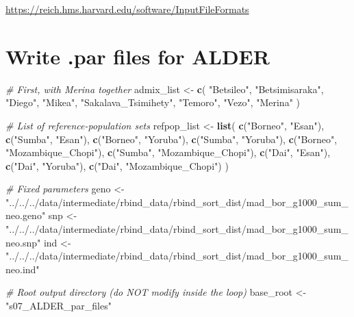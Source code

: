 \documentclass[
]{article}
\newenvironment{Shaded}{\begin{snugshade}}{\end{snugshade}}
\newcommand{\CommentTok}[1]{\textcolor[rgb]{0.56,0.35,0.01}{\textit{#1}}}
\newcommand{\FunctionTok}[1]{\textcolor[rgb]{0.13,0.29,0.53}{\textbf{#1}}}
\newcommand{\NormalTok}[1]{#1}
\newcommand{\OtherTok}[1]{\textcolor[rgb]{0.56,0.35,0.01}{#1}}
\newcommand{\StringTok}[1]{\textcolor[rgb]{0.31,0.60,0.02}{#1}}
\begin{document}
\url{https://reich.hms.harvard.edu/software/InputFileFormats}

\section{Write .par files for ALDER}\label{write-.par-files-for-alder}

\begin{Shaded}
\begin{Highlighting}[]
\CommentTok{\# First, with Merina together}
\NormalTok{admix\_list }\OtherTok{\textless{}{-}} \FunctionTok{c}\NormalTok{(}
  \StringTok{"Betsileo"}\NormalTok{, }\StringTok{"Betsimisaraka"}\NormalTok{, }\StringTok{"Diego"}\NormalTok{, }\StringTok{"Mikea"}\NormalTok{,}
  \StringTok{"Sakalava\_Tsimihety"}\NormalTok{, }\StringTok{"Temoro"}\NormalTok{, }\StringTok{"Vezo"}\NormalTok{, }\StringTok{"Merina"}
\NormalTok{)}

\CommentTok{\# List of reference{-}population sets}
\NormalTok{refpop\_list }\OtherTok{\textless{}{-}} \FunctionTok{list}\NormalTok{(}
  \FunctionTok{c}\NormalTok{(}\StringTok{"Borneo"}\NormalTok{, }\StringTok{"Esan"}\NormalTok{),}
  \FunctionTok{c}\NormalTok{(}\StringTok{"Sumba"}\NormalTok{, }\StringTok{"Esan"}\NormalTok{),}
  \FunctionTok{c}\NormalTok{(}\StringTok{"Borneo"}\NormalTok{, }\StringTok{"Yoruba"}\NormalTok{),}
  \FunctionTok{c}\NormalTok{(}\StringTok{"Sumba"}\NormalTok{, }\StringTok{"Yoruba"}\NormalTok{),}
  \FunctionTok{c}\NormalTok{(}\StringTok{"Borneo"}\NormalTok{, }\StringTok{"Mozambique\_Chopi"}\NormalTok{),}
  \FunctionTok{c}\NormalTok{(}\StringTok{"Sumba"}\NormalTok{, }\StringTok{"Mozambique\_Chopi"}\NormalTok{),}
  \FunctionTok{c}\NormalTok{(}\StringTok{"Dai"}\NormalTok{, }\StringTok{"Esan"}\NormalTok{),}
  \FunctionTok{c}\NormalTok{(}\StringTok{"Dai"}\NormalTok{, }\StringTok{"Yoruba"}\NormalTok{),}
  \FunctionTok{c}\NormalTok{(}\StringTok{"Dai"}\NormalTok{, }\StringTok{"Mozambique\_Chopi"}\NormalTok{)}
\NormalTok{)}

\CommentTok{\# Fixed parameters}
\NormalTok{geno }\OtherTok{\textless{}{-}} \StringTok{"../../../data/intermediate/rbind\_data/rbind\_sort\_dist/mad\_bor\_g1000\_sum\_neo.geno"}
\NormalTok{snp }\OtherTok{\textless{}{-}} \StringTok{"../../../data/intermediate/rbind\_data/rbind\_sort\_dist/mad\_bor\_g1000\_sum\_neo.snp"}
\NormalTok{ind }\OtherTok{\textless{}{-}} \StringTok{"../../../data/intermediate/rbind\_data/rbind\_sort\_dist/mad\_bor\_g1000\_sum\_neo.ind"}

\CommentTok{\# Root output directory (do NOT modify inside the loop)}
\NormalTok{base\_root }\OtherTok{\textless{}{-}} \StringTok{"s07\_ALDER\_par\_files"}


\end{Highlighting}
\end{Shaded}
\end{document}
